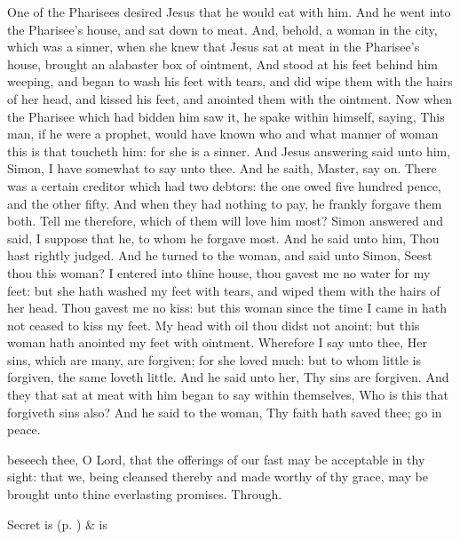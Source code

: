  One of the Pharisees desired Jesus that he would eat with him. And he went into the Pharisee's house, and sat down to meat. And, behold, a woman in the city, which was a sinner, when she knew that Jesus sat at meat in the Pharisee's house, brought an alabaster box of ointment, And stood at his feet behind him weeping, and began to wash his feet with tears, and did wipe them with the hairs of her head, and kissed his feet, and anointed them with the ointment. Now when the Pharisee which had bidden him saw it, he spake within himself, saying, This man, if he were a prophet, would have known who and what manner of woman this is that toucheth him: for she is a sinner. And Jesus answering said unto him, Simon, I have somewhat to say unto thee. And he saith, Master, say on. There was a certain creditor which had two debtors: the one owed five hundred pence, and the other fifty. And when they had nothing to pay, he frankly forgave them both. Tell me therefore, which of them will love him most? Simon answered and said, I suppose that he, to whom he forgave most. And he said unto him, Thou hast rightly judged. And he turned to the woman, and said unto Simon, Seest thou this woman? I entered into thine house, thou gavest me no water for my feet: but she hath washed my feet with tears, and wiped them with the hairs of her head. Thou gavest me no kiss: but this woman since the time I came in hath not ceased to kiss my feet. My head with oil thou didst not anoint: but this woman hath anointed my feet with ointment. Wherefore I say unto thee, Her sins, which are many, are forgiven; for she loved much: but to whom little is forgiven, the same loveth little. And he said unto her, Thy sins are forgiven. And they that sat at meat with him began to say within themselves, Who is this that forgiveth sins also? And he said to the woman, Thy faith hath saved thee; go in peace.


\clearpage
\secret
{} beseech thee, O Lord, that the offerings of our fast may be acceptable in thy sight: that we, being cleansed thereby and made worthy of thy grace, may be brought unto thine everlasting promises. Through.
\begin{rubric}
     Secret is  (p. \pageref{SPSaints}) \&  is 
\end{rubric}

